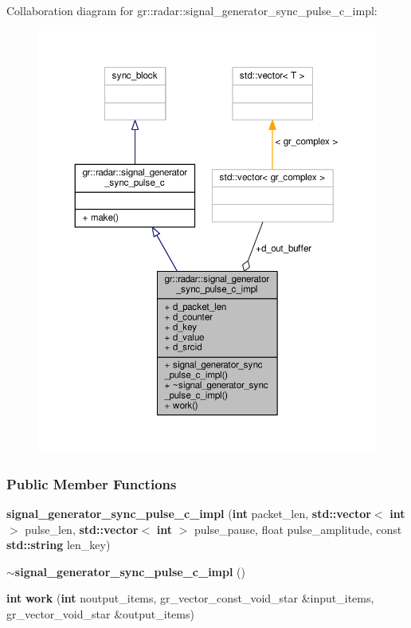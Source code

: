 Collaboration diagram for gr\+:\+:radar\+:\+:signal\+\_\+generator\+\_\+sync\+\_\+pulse\+\_\+c\+\_\+impl\+:
\nopagebreak
\begin{figure}[H]
\begin{center}
\leavevmode
\includegraphics[width=350pt]{dd/dce/classgr_1_1radar_1_1signal__generator__sync__pulse__c__impl__coll__graph}
\end{center}
\end{figure}
\subsubsection*{Public Member Functions}
\begin{DoxyCompactItemize}
\item 
{\bf signal\+\_\+generator\+\_\+sync\+\_\+pulse\+\_\+c\+\_\+impl} ({\bf int} packet\+\_\+len, {\bf std\+::vector}$<$ {\bf int} $>$ pulse\+\_\+len, {\bf std\+::vector}$<$ {\bf int} $>$ pulse\+\_\+pause, float pulse\+\_\+amplitude, const {\bf std\+::string} len\+\_\+key)
\item 
{\bf $\sim$signal\+\_\+generator\+\_\+sync\+\_\+pulse\+\_\+c\+\_\+impl} ()
\item 
{\bf int} {\bf work} ({\bf int} noutput\+\_\+items, gr\+\_\+vector\+\_\+const\+\_\+void\+\_\+star \&input\+\_\+items, gr\+\_\+vector\+\_\+void\+\_\+star \&output\+\_\+items)
\end{DoxyCompactItemize}

